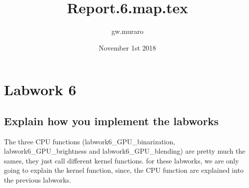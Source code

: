 \documentclass{article}
\title{Report.6.map.tex}
\author{gw.muraro}
\date{November 1st 2018}
\begin{document}
\maketitle
\section{Labwork 6}

\subsection{Explain how you implement the labworks}
    
    The three CPU functions (labwork6\_GPU\_binarization, labwork6\_GPU\_brightness and labwork6\_GPU\_blending) are pretty much the sames, they just call different kernel functions. for these labworks, we are only going to explain the kernel function, since, the CPU function are explained into the previous labworks. 
    
\end{document}
